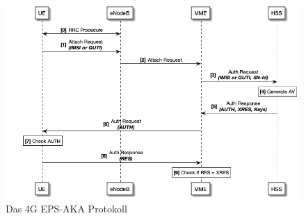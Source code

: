 \begin{figure}[H]
  \centering
  \includegraphics[width=\textwidth]{uml/4g-protocol_v1.png}
  \caption{Das 4G EPS-AKA Protokoll}
  \label{fig:4g_protocol_v1}
\end{figure}

